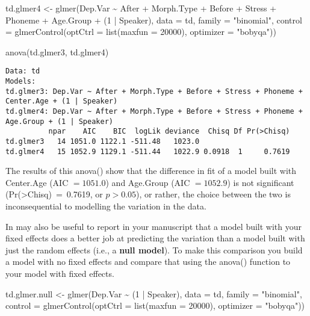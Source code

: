 \documentclass[
  10pt,
  letterpaper]{article}
\newenvironment{Shaded}{\begin{snugshade}}{\end{snugshade}}
\newcommand{\AttributeTok}[1]{\textcolor[rgb]{0.40,0.45,0.13}{#1}}
\newcommand{\DecValTok}[1]{\textcolor[rgb]{0.68,0.00,0.00}{#1}}
\newcommand{\FunctionTok}[1]{\textcolor[rgb]{0.28,0.35,0.67}{#1}}
\newcommand{\NormalTok}[1]{\textcolor[rgb]{0.00,0.23,0.31}{#1}}
\newcommand{\OtherTok}[1]{\textcolor[rgb]{0.00,0.23,0.31}{#1}}
\newcommand{\SpecialCharTok}[1]{\textcolor[rgb]{0.37,0.37,0.37}{#1}}
\newcommand{\StringTok}[1]{\textcolor[rgb]{0.13,0.47,0.30}{#1}}
\renewcommand\texttt[1]{{\ttfamily\color{BrickRed}#1}}
\begin{document}
\begin{tcolorbox}
\begin{Shaded}
\begin{Highlighting}[]
\NormalTok{td.glmer4 }\OtherTok{\textless{}{-}} \FunctionTok{glmer}\NormalTok{(Dep.Var }\SpecialCharTok{\textasciitilde{}}\NormalTok{ After }\SpecialCharTok{+}\NormalTok{ Morph.Type }\SpecialCharTok{+}\NormalTok{ Before }\SpecialCharTok{+}
\NormalTok{    Stress }\SpecialCharTok{+}\NormalTok{ Phoneme }\SpecialCharTok{+}\NormalTok{ Age.Group }\SpecialCharTok{+}\NormalTok{ (}\DecValTok{1} \SpecialCharTok{|}\NormalTok{ Speaker), }\AttributeTok{data =}\NormalTok{ td,}
    \AttributeTok{family =} \StringTok{"binomial"}\NormalTok{, }\AttributeTok{control =} \FunctionTok{glmerControl}\NormalTok{(}\AttributeTok{optCtrl =} \FunctionTok{list}\NormalTok{(}\AttributeTok{maxfun =} \DecValTok{20000}\NormalTok{),}
        \AttributeTok{optimizer =} \StringTok{"bobyqa"}\NormalTok{))}

\FunctionTok{anova}\NormalTok{(td.glmer3, td.glmer4)}
\end{Highlighting}
\end{Shaded}

\begin{verbatim}
Data: td
Models:
td.glmer3: Dep.Var ~ After + Morph.Type + Before + Stress + Phoneme + Center.Age + (1 | Speaker)
td.glmer4: Dep.Var ~ After + Morph.Type + Before + Stress + Phoneme + Age.Group + (1 | Speaker)
          npar    AIC    BIC  logLik deviance  Chisq Df Pr(>Chisq)
td.glmer3   14 1051.0 1122.1 -511.48   1023.0                     
td.glmer4   15 1052.9 1129.1 -511.44   1022.9 0.0918  1     0.7619
\end{verbatim}

The results of this \texttt{anova()} show that the difference in fit of
a model built with \texttt{Center.Age} (\texttt{AIC} \(= 1051.0\)) and
\texttt{Age.Group} (\texttt{AIC} \(= 1052.9\)) is not significant
(\texttt{Pr(\textgreater{}Chisq)\ =\ 0.7619}, or \(p>0.05\)), or rather,
the choice between the two is inconsequential to modelling the variation
in the data.

In may also be useful to report in your manuscript that a model built
with your fixed effects does a better job at predicting the variation
than a model built with just the random effects (i.e., a \textbf{null
model}). To make this comparison you build a model with no fixed effects
and compare that using the \texttt{anova()} function to your model with
fixed effects.

\begin{Shaded}
\begin{Highlighting}[]
\NormalTok{td.glmer.null }\OtherTok{\textless{}{-}} \FunctionTok{glmer}\NormalTok{(Dep.Var }\SpecialCharTok{\textasciitilde{}}\NormalTok{ (}\DecValTok{1} \SpecialCharTok{|}\NormalTok{ Speaker), }\AttributeTok{data =}\NormalTok{ td,}
    \AttributeTok{family =} \StringTok{"binomial"}\NormalTok{, }\AttributeTok{control =} \FunctionTok{glmerControl}\NormalTok{(}\AttributeTok{optCtrl =} \FunctionTok{list}\NormalTok{(}\AttributeTok{maxfun =} \DecValTok{20000}\NormalTok{),}
        \AttributeTok{optimizer =} \StringTok{"bobyqa"}\NormalTok{))}


\end{Highlighting}
\end{Shaded}
\end{tcolorbox}
\end{document}
